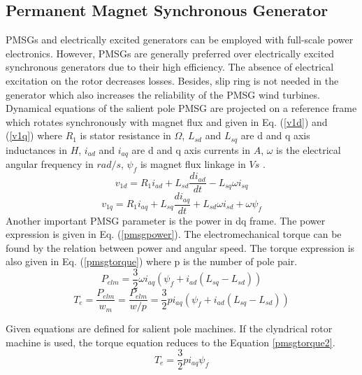 \subsection{Permanent Magnet Synchronous Generator}
\label{pmsgsection}
PMSGs and electrically excited generators can be employed with full-scale power electronics. However, PMSGs are generally preferred over electrically excited synchronous generators due to their high efficiency. The absence of electrical excitation on the rotor decreases losses. Besides, slip ring is not needed in the generator which also increases the reliability of the PMSG wind turbines. Dynamical equations of the salient pole PMSG are projected on a reference frame which rotates synchronously with magnet flux and given in Eq. (\ref{v1d}) and (\ref{v1q}) where $R_{1}$ is stator resistance in $\Omega$, $L_{sd}$ and $L_{sq}$ are d and q axis inductances in $H$, $i_{ad}$ and $i_{aq}$ are d and q axis currents in $A$, $\omega$ is the electrical angular frequency in $rad/s$, $\psi_{f}$ is magnet flux linkage in $Vs$ \cite{Ackermann2005a}. 
\begin{equation}
v_{1d}=R_{1} i_{ad}+L_{sd}\frac{di_{ad}}{dt}-L_{sq}\omega i_{sq}
\label{v1d}
\end{equation}
\begin{equation}
v_{1q}=R_{1} i_{aq}+L_{sq}\frac{di_{aq}}{dt}+L_{sd}\omega i_{sd}+\omega \psi_{f}
\label{v1q}
\end{equation}
Another important PMSG parameter is the power in dq frame. The power expression is given in Eq. (\ref{pmsgpower}). The electromechanical torque can be found by the relation between power and angular speed. The torque expression is also given in Eq. (\ref{pmsgtorque}) where p is the number of pole pair.
\begin{equation}
P_{elm}=\frac{3}{2}\omega i_{aq} (\psi_{f}+i_{ad}(L_{sq}-L_{sd}))
\label{pmsgpower}
\end{equation}
\begin{equation}
T_{e}=\frac{P_{elm}}{w_{m}}=\frac{P_{elm}}{w/p}=\frac{3}{2}p i_{aq} (\psi_{f}+i_{ad}(L_{sq}-L_{sd}))
\label{pmsgtorque}
\end{equation}

Given equations are defined for salient pole machines. If the clyndrical rotor machine is used, the torque equation reduces to the Equation \ref{pmsgtorque2}.
\begin{equation}
T_{e}=\frac{3}{2}p i_{aq} \psi_{f}
\label{pmsgtorque2}
\end{equation}
